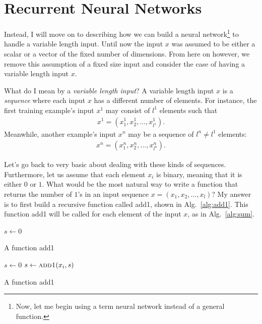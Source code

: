 \documentclass{report}
\begin{document}
\section{Recurrent Neural Networks}
\label{sec:rnn}

Instead, I will move on to describing how we can build a neural
network\footnote{
    Now, let me begin using a term neural network instead of a general function.
} to handle a variable length input. Until now the input $x$ was assumed to be
either a scalar or a vector of the fixed number of dimensions. From here on
however, we remove this assumption of a fixed size input and consider the case
of having a variable length input $x$. 

What do I mean by a {\em variable length input}? A variable length input $x$ is
a {\em sequence} where each input $x$ has a different number of elements. For
instance, the first training example's input $x^1$ may consist of $l^1$ elements
such that
\begin{align*}
    x^1 = (x^1_1, x^1_2, \ldots, x^1_{l^1}).
\end{align*}
Meanwhile, another example's input $x^n$ may be a sequence of $l^n \neq l^1$ elements:
\begin{align*}
    x^n = (x^n_1, x^n_2, \ldots, x^n_{l^n}).
\end{align*}

Let's go back to very basic about dealing with these kinds of sequences.
Furthermore, let us assume that each element $x_i$ is binary, meaning that it is
either $0$ or $1$. What would be the most natural way to write a function that
returns the number of $1$'s in an input sequence $x=(x_1,x_2,\ldots,x_{l})$? My
answer is to first build a recursive function called {\sc add1}, shown in
Alg.~\ref{alg:add1}.  This function {\sc add1} will be called for each element of
the input $x$, as in Alg.~\ref{alg:sum}.

\begin{algorithm}[ht]
\begin{algorithmic}
    \State $s \leftarrow 0$
    \Else~
    \EndIf
    \EndFunction
\end{algorithmic}
\caption{A function {\sc add1}}
\label{alg:add1}
\end{algorithm}

\begin{algorithm}[ht]
\begin{algorithmic}
    \State $s \leftarrow 0$
    $s \leftarrow \text{\sc{add1}}(x_i,s)$
    \EndFor
\end{algorithmic}
\caption{A function {\sc add1}}
\label{alg:sum}
\end{algorithm}
\end{document}
